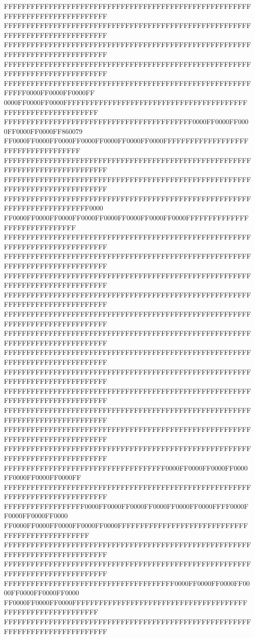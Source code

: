 FFFFFFFFFFFFFFFFFFFFFFFFFFFFFFFFFFFFFFFFFFFFFFFFFFFFFFFFFFFFFFFFFFFFFFFFFFFFFF
FFFFFFFFFFFFFFFFFFFFFFFFFFFFFFFFFFFFFFFFFFFFFFFFFFFFFFFFFFFFFFFFFFFFFFFFFFFFFF
FFFFFFFFFFFFFFFFFFFFFFFFFFFFFFFFFFFFFFFFFFFFFFFFFFFFFFFFFFFFFFFFFFFFFFFFFFFFFF
FFFFFFFFFFFFFFFFFFFFFFFFFFFFFFFFFFFFFFFFFFFFFFFFFFFFFFFFFFFFFFFFFFFFFFFFFFFFFF
FFFFFFFFFFFFFFFFFFFFFFFFFFFFFFFFFFFFFFFFFFFFFFFFFFFFFFFFFFFF0000FF0000FF0000FF
0000FF0000FF0000FFFFFFFFFFFFFFFFFFFFFFFFFFFFFFFFFFFFFFFFFFFFFFFFFFFFFFFFFFFFFF
FFFFFFFFFFFFFFFFFFFFFFFFFFFFFFFFFFFFFFFFFF0000FF0000FF0000FF0000FF0000FF860079
FF0000FF0000FF0000FF0000FF0000FF0000FF0000FFFFFFFFFFFFFFFFFFFFFFFFFFFFFFFFFFFF
FFFFFFFFFFFFFFFFFFFFFFFFFFFFFFFFFFFFFFFFFFFFFFFFFFFFFFFFFFFFFFFFFFFFFFFFFFFFFF
FFFFFFFFFFFFFFFFFFFFFFFFFFFFFFFFFFFFFFFFFFFFFFFFFFFFFFFFFFFFFFFFFFFFFFFFFFFFFF
FFFFFFFFFFFFFFFFFFFFFFFFFFFFFFFFFFFFFFFFFFFFFFFFFFFFFFFFFFFFFFFFFFFFFFFFFF0000
FF0000FF0000FF0000FF0000FF0000FF0000FF0000FF0000FFFFFFFFFFFFFFFFFFFFFFFFFFFFFF
FFFFFFFFFFFFFFFFFFFFFFFFFFFFFFFFFFFFFFFFFFFFFFFFFFFFFFFFFFFFFFFFFFFFFFFFFFFFFF
FFFFFFFFFFFFFFFFFFFFFFFFFFFFFFFFFFFFFFFFFFFFFFFFFFFFFFFFFFFFFFFFFFFFFFFFFFFFFF
FFFFFFFFFFFFFFFFFFFFFFFFFFFFFFFFFFFFFFFFFFFFFFFFFFFFFFFFFFFFFFFFFFFFFFFFFFFFFF
FFFFFFFFFFFFFFFFFFFFFFFFFFFFFFFFFFFFFFFFFFFFFFFFFFFFFFFFFFFFFFFFFFFFFFFFFFFFFF
FFFFFFFFFFFFFFFFFFFFFFFFFFFFFFFFFFFFFFFFFFFFFFFFFFFFFFFFFFFFFFFFFFFFFFFFFFFFFF
FFFFFFFFFFFFFFFFFFFFFFFFFFFFFFFFFFFFFFFFFFFFFFFFFFFFFFFFFFFFFFFFFFFFFFFFFFFFFF
FFFFFFFFFFFFFFFFFFFFFFFFFFFFFFFFFFFFFFFFFFFFFFFFFFFFFFFFFFFFFFFFFFFFFFFFFFFFFF
FFFFFFFFFFFFFFFFFFFFFFFFFFFFFFFFFFFFFFFFFFFFFFFFFFFFFFFFFFFFFFFFFFFFFFFFFFFFFF
FFFFFFFFFFFFFFFFFFFFFFFFFFFFFFFFFFFFFFFFFFFFFFFFFFFFFFFFFFFFFFFFFFFFFFFFFFFFFF
FFFFFFFFFFFFFFFFFFFFFFFFFFFFFFFFFFFFFFFFFFFFFFFFFFFFFFFFFFFFFFFFFFFFFFFFFFFFFF
FFFFFFFFFFFFFFFFFFFFFFFFFFFFFFFFFFFFFFFFFFFFFFFFFFFFFFFFFFFFFFFFFFFFFFFFFFFFFF
FFFFFFFFFFFFFFFFFFFFFFFFFFFFFFFFFFFFFFFFFFFFFFFFFFFFFFFFFFFFFFFFFFFFFFFFFFFFFF
FFFFFFFFFFFFFFFFFFFFFFFFFFFFFFFFFFFF0000FF0000FF0000FF0000FF0000FF0000FF0000FF
FFFFFFFFFFFFFFFFFFFFFFFFFFFFFFFFFFFFFFFFFFFFFFFFFFFFFFFFFFFFFFFFFFFFFFFFFFFFFF
FFFFFFFFFFFFFFFFFF0000FF0000FF0000FF0000FF0000FF0000FFFF0000FF0000FF0000FF0000
FF0000FF0000FF0000FF0000FF0000FFFFFFFFFFFFFFFFFFFFFFFFFFFFFFFFFFFFFFFFFFFFFFFF
FFFFFFFFFFFFFFFFFFFFFFFFFFFFFFFFFFFFFFFFFFFFFFFFFFFFFFFFFFFFFFFFFFFFFFFFFFFFFF
FFFFFFFFFFFFFFFFFFFFFFFFFFFFFFFFFFFFFFFFFFFFFFFFFFFFFFFFFFFFFFFFFFFFFFFFFFFFFF
FFFFFFFFFFFFFFFFFFFFFFFFFFFFFFFFFFFFFF0000FF0000FF0000FF0000FF0000FF0000FF0000
FF0000FF0000FF0000FFFFFFFFFFFFFFFFFFFFFFFFFFFFFFFFFFFFFFFFFFFFFFFFFFFFFFFFFFFF
FFFFFFFFFFFFFFFFFFFFFFFFFFFFFFFFFFFFFFFFFFFFFFFFFFFFFFFFFFFFFFFFFFFFFFFFFFFFFF
